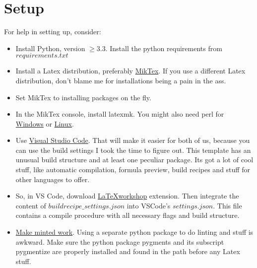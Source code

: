 \chapter*[Setup]{Setup}
For help in setting up, consider:
\begin{itemize}
	\item Install Python, version $\geq 3.3$. Install the python requirements from $requirements.txt$ 
	\item Install a Latex distribution, preferably 
	\href{https://miktex.org/howto/install-miktex-unx}{MikTex}. If you use 
	a different Latex distribution, don't blame me for installations being 
	a pain in the ass. 
	\item Set MikTex to installing packages on the fly.
	\item In the MikTex console, install latexmk. You might also need perl for
	\href{http://strawberryperl.com/}{Windows} or  
	\href{https://www.perl.org/get.html}{Linux}.
	\item Use \href{https://code.visualstudio.com/}{Visual Studio Code}. 
	That will make it easier for both of us, because you can use the build 
	settings I took the time to figure out. This template has an unusual 
	build structure and at least one peculiar package. Its got a lot of cool stuff, 
	like automatic compilation, formula preview, build recipes and stuff for other 
	languages to offer.
	\item So, in VS Code, download 
	\href{https://marketplace.visualstudio.com/items?itemName=James-Yu.latex-workshop}
	{\LaTeX workshop} extension. Then integrate the content of $buildrecipe\_settings.json$ 
	into VSCode's $settings.json$. 
	This file contains a compile procedure with all necessary flags and build structure.
	\item \href{
		https://superuser.com/questions/816340/minted-cannot-find-pygmentize-in-texstudio-on-windows-7/1382840
		}{Make minted work}.
	Using a separate python package to do linting and stuff is awkward. 
	Make sure the python package pygments and its subscript pygmentize 
	are properly installed and found in the path before any Latex stuff. 
\end{itemize}

